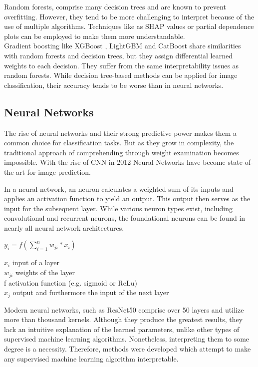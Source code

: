 Random forests, comprise many decision trees and are known to prevent overfitting. However, they tend to be more challenging to interpret because of the use of multiple algorithms. Techniques like as SHAP values \cite{lundberg2017unified} or partial dependence plots \cite{PDP} can be employed to make them more understandable.
\\
Gradient boosting like XGBoost \cite{Chen_2016}, LightGBM \cite{Ke2017} and CatBoost \cite{prokhorenkova2019catboost} share similarities with random forests and decision trees, but they assign differential learned weights to each decision. They suffer from the same interpretability issues as random forests. While decision tree-based methods can be applied for image classification, their accuracy tends to be worse than in neural networks.


\subsection{Neural Networks}

The rise of neural networks and their strong predictive power makes them a common choice for classification tasks. But as they grow in complexity, the traditional approach of comprehending through weight examination becomes impossible. With the rise of CNN in 2012 \cite{krizhevsky2012nn} Neural Networks have become state-of-the-art for image prediction. 

In a neural network, an neuron calculates a weighted sum of its inputs and applies an activation function to yield an output. This output then serves as the input for the subsequent layer. While various neuron types exist, including convolutional and recurrent neurons, the foundational neurons can be found in nearly all neural network architectures. 

$y_i = f(\sum_{i=1}^{n} w_{ji} \ast x_i)$

\textbullet$x_i$ input of a layer\\
\textbullet $w_{ji}$ weights of the layer\\
\textbullet f activation function (e.g. sigmoid or ReLu)\\
\textbullet $x_j$ output and furthermore the input of the next layer


Modern neural networks, such as ResNet50 \cite{he2015deep} comprise over 50 layers and utilize more than thousand kernels. Although they produce the greatest results, they lack an intuitive explanation of the learned parameters, unlike other types of supervised machine learning algorithms.  Nonetheless, interpreting them to some degree is a necessity. Therefore, methods were developed which attempt to make any supervised machine learning algorithm interpretable.

